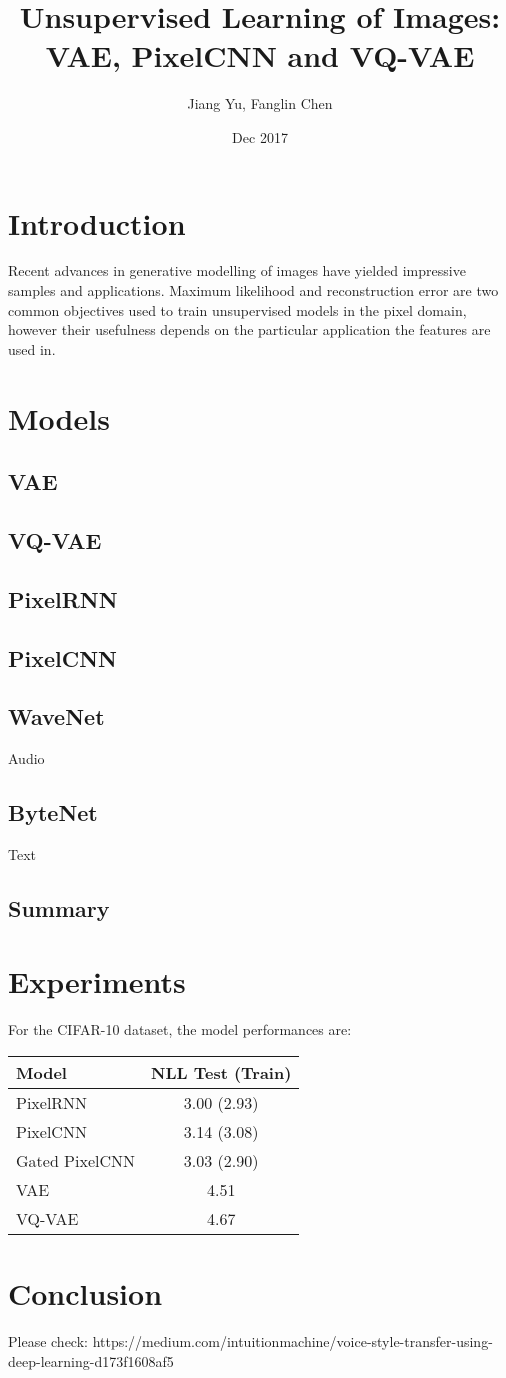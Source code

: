 \documentclass[11pt,a4paper]{article}
\begin{document}
\title{Unsupervised Learning of Images:\\VAE, PixelCNN and VQ-VAE}
\author{Jiang Yu, Fanglin Chen}
\date{Dec 2017}
\maketitle

\section{Introduction}
Recent advances in generative modelling of images have yielded impressive samples and applications. Maximum likelihood and reconstruction error are two common objectives used to train unsupervised models in the pixel domain, however their usefulness depends on the particular application the features are used in.

\section{Models}
\subsection{VAE}
\subsection{VQ-VAE}
\subsection{PixelRNN}
\subsection{PixelCNN}
\subsection{WaveNet}
Audio
\subsection{ByteNet}
Text
\subsection{Summary}

\section{Experiments}
For the CIFAR-10 dataset, the model performances are:\\
\begin{tabular}{lc}
	\hline Model & NLL Test (Train) \\
	\hline PixelRNN & 3.00 (2.93) \\
	\hline PixelCNN & 3.14 (3.08) \\
	\hline Gated PixelCNN & 3.03 (2.90) \\
	\hline VAE & 4.51 \\
	\hline VQ-VAE & 4.67 \\
	\hline 
\end{tabular}

\section{Conclusion}
Please check: 
https://medium.com/intuitionmachine/voice-style-transfer-using-deep-learning-d173f1608af5
\end{document}
